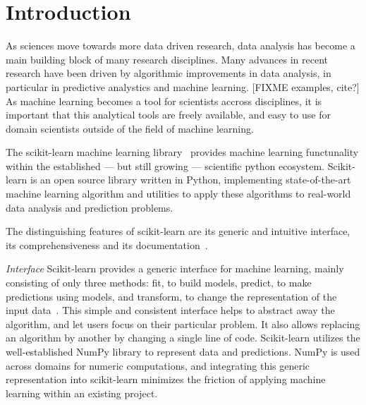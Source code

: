 




\setcounter{section}{0}
\section{Introduction}
As sciences move towards more data driven research, data analysis has
become a main building block of many research disciplines.
Many advances in recent research have been driven by algorithmic improvements
in data analysis, in particular in predictive analystics and machine learning.
[FIXME examples, cite?]
As machine learning becomes a tool for scientists accross disciplines, it is
important that this analytical tools are freely available, and easy to use for
domain scientists outside of the field of machine learning.


The scikit-learn machine learning library~\cite{pedregosa2011scikit} provides machine learning functunality
within the established --- but still growing --- scientific python ecosystem.
Scikit-learn is an open source library written in Python, implementing state-of-the-art
machine learning algorithm and utilities to apply these algorithms to real-world
data analysis and prediction problems.

The distinguishing features of scikit-learn are its generic and intuitive
interface, its comprehensiveness and its documentation~\cite{Varoquaux:2015:SML:2786984.2786995}.

\emph{Interface} Scikit-learn provides a generic interface for machine learning, mainly consisting
of only three methods: fit, to build models, predict, to make predictions using models,
and transform, to change the representation of the input data~\cite{buitinck2013api}.
This simple and consistent interface helps to abstract away the algorithm, and let
users focus on their particular problem. It also allows replacing an algorithm by another
by changing a single line of code.
Scikit-learn utilizes the well-established NumPy library to represent data and predictions.
NumPy is used across domains for numeric computations, and integrating this generic
representation into scikit-learn minimizes the friction of applying machine learning
within an existing project.

